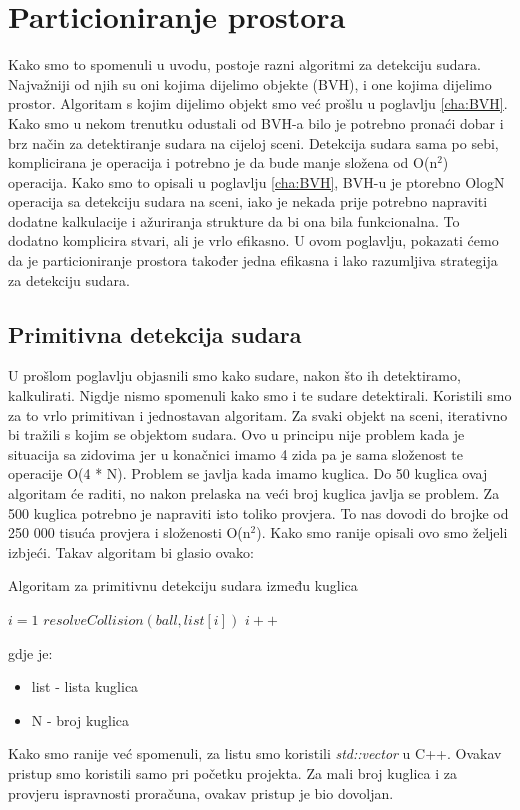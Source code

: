 \chapter{Particioniranje prostora}
Kako smo to spomenuli u uvodu, postoje razni algoritmi za detekciju sudara. Najvažniji od njih su oni kojima dijelimo objekte (BVH), i one kojima dijelimo prostor. Algoritam s kojim dijelimo objekt smo već prošlu u poglavlju \ref{cha:BVH}. Kako smo u nekom trenutku odustali od BVH-a bilo je potrebno pronaći dobar i brz način za detektiranje sudara na cijeloj sceni. Detekcija sudara sama po sebi, komplicirana je operacija i potrebno je da bude manje složena od O(n\texttt{$^2$}) operacija. Kako smo to opisali u poglavlju \ref{cha:BVH}, BVH-u je ptorebno O{logN} operacija sa detekciju sudara na sceni, iako je nekada prije potrebno napraviti dodatne kalkulacije i ažuriranja strukture da bi ona bila funkcionalna. To dodatno komplicira stvari, ali je vrlo efikasno. U ovom poglavlju, pokazati ćemo da je particioniranje prostora također jedna efikasna i lako razumljiva strategija za detekciju sudara.

\section{Primitivna detekcija sudara}
U prošlom poglavlju objasnili smo kako sudare, nakon što ih detektiramo, kalkulirati. Nigdje nismo spomenuli kako smo i te sudare detektirali. Koristili smo za to vrlo primitivan i jednostavan algoritam. Za svaki objekt na sceni, iterativno bi tražili s kojim se objektom sudara. Ovo u principu nije problem kada je situacija sa zidovima jer u konačnici imamo 4 zida pa je sama složenost te operacije O(4 * N). Problem se javlja kada imamo kuglica. Do 50 kuglica ovaj algoritam će raditi, no nakon prelaska na veći broj kuglica javlja se problem. Za 500 kuglica potrebno je napraviti isto toliko provjera. To nas dovodi do brojke od 250 000 tisuća provjera i složenosti O(n\texttt{$^2$}). Kako smo ranije opisali ovo smo željeli izbjeći. Takav algoritam bi glasio ovako:
\begin{algorithm}
	\caption{Algoritam za primitivnu detekciju sudara između kuglica}
	\label{alg:primitive_collision}
	\begin{algorithmic}
		\State $i = 1$
		\State $resolveCollision(ball,list[i])$
		\EndIf
		\State $i++$
		\EndWhile
		\EndFor
		\EndFunction
	\end{algorithmic}
\end{algorithm}
gdje je:
\begin{itemize}
	\item list - lista kuglica
	\item N - broj kuglica
\end{itemize}
Kako smo ranije već spomenuli, za listu smo koristili \emph{std::vector} u C++. Ovakav pristup smo koristili samo pri početku projekta. Za mali broj kuglica i za provjeru ispravnosti proračuna, ovakav pristup je bio dovoljan. \newpage
